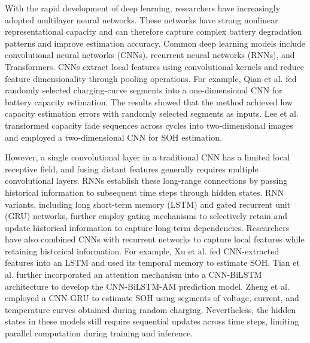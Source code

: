 With the rapid development of deep learning, researchers have increasingly adopted multilayer neural networks. These networks have strong nonlinear representational capacity and can therefore capture complex battery degradation patterns and improve estimation accuracy\cite{ref14}. Common deep learning models include convolutional neural networks (CNNs), recurrent neural networks (RNNs), and Transformers. CNNs extract local features using convolutional kernels and reduce feature dimensionality through pooling operations. For example, Qian et al.\cite{ref29} fed randomly selected charging-curve segments into a one-dimensional CNN for battery capacity estimation. The results showed that the method achieved low capacity estimation errors with randomly selected segments as inputs. Lee et al.\cite{ref30} transformed capacity fade sequences across cycles into two-dimensional images and employed a two-dimensional CNN for SOH estimation.

However, a single convolutional layer in a traditional CNN has a limited local receptive field, and fusing distant features generally requires multiple convolutional layers\cite{ref31}. RNNs establish these long-range connections by passing historical information to subsequent time steps through hidden states. RNN variants, including long short-term memory (LSTM) and gated recurrent unit (GRU) networks, further employ gating mechanisms to selectively retain and update historical information to capture long-term dependencies. Researchers have also combined CNNs with recurrent networks to capture local features while retaining historical information. For example, Xu et al.\cite{ref41} fed CNN-extracted features into an LSTM and used its temporal memory to estimate SOH. Tian et al.\cite{ref42} further incorporated an attention mechanism into a CNN-BiLSTM architecture to develop the CNN-BiLSTM-AM prediction model. Zheng et al.\cite{ref33} employed a CNN-GRU to estimate SOH using segments of voltage, current, and temperature curves obtained during random charging. Nevertheless, the hidden states in these models still require sequential updates across time steps, limiting parallel computation during training and inference.

